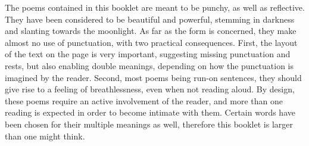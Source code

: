 The poems contained in this booklet are meant to be punchy, as well as reflective. They have been considered to be beautiful and powerful, stemming in darkness and slanting towards the moonlight. As far as the form is concerned, they make almost no use of punctuation, with two practical consequences. First, the layout of the text on the page is very important, suggesting missing punctuation and rests, but also enabling double meanings, depending on how the punctuation is imagined by the reader. Second, most poems being run-on sentences, they should give rise to a feeling of breathlessness, even when not reading aloud. By design, these poems require an active involvement of the reader, and more than one reading is expected in order to become intimate with them. Certain words have been chosen for their multiple meanings as well, therefore this booklet is larger than one might think.
